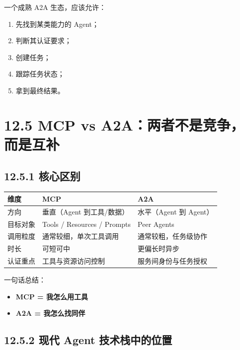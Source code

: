 一个成熟 A2A 生态，应该允许：


\begin{enumerate}[leftmargin=2em]
\item 先找到某类能力的 Agent；
\item 判断其认证要求；
\item 创建任务；
\item 跟踪任务状态；
\item 拿到最终结果。
\end{enumerate}

\section{12.5 MCP vs A2A：两者不是竞争，而是互补}

\subsection{12.5.1 核心区别}

\begingroup
\scriptsize
\setlength{\tabcolsep}{3pt}
\begin{longtable}{|p{}|p{}|p{}|}
\hline
维度 & MCP & A2A \\ \hline
方向 & 垂直（Agent 到工具/数据） & 水平（Agent 到 Agent） \\ \hline
目标对象 & Tools / Resources / Prompts & Peer Agents \\ \hline
调用粒度 & 通常较细，单次工具调用 & 通常较粗，任务级协作 \\ \hline
时长 & 可短可中 & 更偏长时异步 \\ \hline
认证重点 & 工具与资源访问控制 & 服务间身份与任务授权 \\ \hline
\end{longtable}
\endgroup

一句话总结：


\begin{itemize}[leftmargin=2em]
\item \textbf{MCP = 我怎么用工具}
\item \textbf{A2A = 我怎么找同伴}
\end{itemize}

\subsection{12.5.2 现代 Agent 技术栈中的位置}

